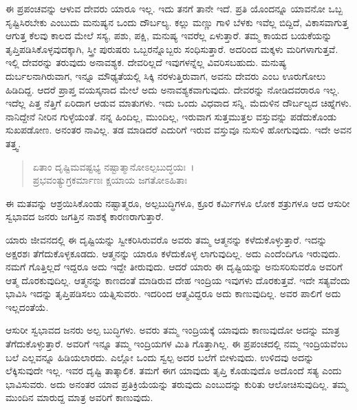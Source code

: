 ಈ ಪ್ರಪಂಚವನ್ನು ಆಳುವ ದೇವರು ಯಾರೂ ಇಲ್ಲ. ಇದು ತನಗೆ ತಾನೇ ಇದೆ. ಪ್ರತಿ ಯೊಂದನ್ನೂ ಯಾವನೋ ಒಬ್ಬ ಸೃಷ್ಟಿಸಿರಬೇಕು ಎಂಬುದು ಮನುಷ್ಯನ ಒಂದು ದೌರ್ಬಲ್ಯ. ಕಲ್ಲು ಮಣ್ಣು ಗಾಳಿ ಬೆಳಕು ಇವೆಲ್ಲ ಬಿದ್ದಿದೆ, ವಿಕಾಸವಾಗುತ್ತ ಆಗುತ್ತ ಕೆಲವು ಕಾಲದ ಮೇಲೆ ಸಸ್ಯ, ಪಶು, ಪಕ್ಷಿ, ಮನುಷ್ಯ ಇವರೆಲ್ಲ ಏಳುತ್ತಾರೆ. ತಮ್ಮ ಕಾಯದ ಬಯಕೆಯನ್ನು ತೃಪ್ತಿಪಡಿಸಿಕೊಳ್ಳವುದಕ್ಕಾಗಿ, ಸ್ತ್ರೀ ಪುರುಷರು ಒಬ್ಬರನ್ನೊಬ್ಬರು ಸಂಧಿಸುತ್ತಾರೆ. ಅದರಿಂದ ಮಕ್ಕಳು ಮರಿಗಳಾಗುತ್ತವೆ. ಇಲ್ಲಿ ದೇವರನ್ನು ತರುವುದು ಅನಾವಶ್ಯಕ. ದೇವರಿಲ್ಲದೆ ಇವುಗಳನ್ನೆಲ್ಲ ವಿವರಿಸಬಹುದು. ಮನುಷ್ಯ ದುರ್ಬಲನಾಗಿರುವಾಗ, ಇನ್ನೂ ಮೌಢ್ಯತೆಯಲ್ಲಿ ಸಿಕ್ಕಿ ನರಳುತ್ತಿರುವಾಗ, ಅವನು ದೇವರು ಎಂಬ ಊರುಗೋಲು ಹಿಡಿದಿದ್ದ. ಆದರೆ ಪ್ರಾಪ್ತ ವಯಸ್ಕನಾದ ಮೇಲೆ ಅದು ಅನಾವಶ್ಯಕವಾಗುವುದು. ದೇವರನ್ನು ನೋಡಿದವರಾರೂ ಇಲ್ಲ. ಇದೆಲ್ಲ ಪಿತ್ತ ನೆತ್ತಿಗೆ ಏರಿದಾಗ ಆಡುವ ಮಾತುಗಳು. ಇದು ಒಂದು ವಿಧವಾದ ಸನ್ನಿ. ಮೆದುಳಿನ ದೌರ್ಬಲ್ಯದ ಚಿಹ್ನೆಗಳು. ನಾನಿದ್ದೇನೆ ನೀರಿನ ಗುಳ್ಳೆಯಂತೆ. ನನ್ನ ಹಿಂದಿಲ್ಲ, ಮುಂದಿಲ್ಲ, ಇರುವಾಗ ಸುತ್ತಮುತ್ತಲ ವಸ್ತುವನ್ನು ಪಡೆದುಕೊಂಡು ಸುಖಪಡೋಣ. ಅನಂತರ ನಾವಿಲ್ಲ. ತಡ ಮಾಡಿದರೆ ಎದುರಿಗೆ ಇರುವ ವಸ್ತುವೂ ನುಸುಳಿ ಹೋಗುವುದು. ಇದೇ ಅವನ ತತ್ತ್ವ.

\begin{verse}
ಏತಾಂ ದೃಷ್ಟಿಮವಷ್ಟಭ್ಯ ನಷ್ಟಾತ್ಮಾನೋಽಲ್ಪಬುದ್ಧಯಃ~।\\ಪ್ರಭವಂತ್ಯುಗ್ರಕರ್ಮಾಣಃ ಕ್ಷಯಾಯ ಜಗತೋಽಹಿತಾಃ 
\end{verse}

{\small ಈ ಮತವನ್ನು ಆಶ್ರಯಿಸಿಕೊಂಡು ನಷ್ಟಾತ್ಮರೂ, ಅಲ್ಪಬುದ್ಧಿಗಳೂ, ಕ್ರೂರ ಕರ್ಮಿಗಳೂ ಲೋಕ ಶತ್ರುಗಳೂ ಆದ ಆಸುರೀ ಸ್ವಭಾವದ ಜನರು ಜಗತ್ತಿನ ನಾಶಕ್ಕೆ ಕಾರಣರಾಗುತ್ತಾರೆ.}

ಯಾರು ಜೀವನದಲ್ಲಿ ಈ ದೃಷ್ಟಿಯನ್ನು ಸ್ವೀಕರಿಸಿರುವರೊ ಅವರು ತಮ್ಮ ಆತ್ಮನನ್ನು ಕಳೆದುಕೊಳ್ಳುತ್ತಾರೆ. ಇದನ್ನು ಅಕ್ಷರಶಃ ತೆಗೆದುಕೊಳ್ಳಕೂಡದು. ಆತ್ಮನನ್ನು ಯಾರೂ ಕಳೆದುಕೊಳ್ಳ ಲಾಗುವುದಿಲ್ಲ. ಅದು ಎಂದೆಂದಿಗೂ ಇರುವುದು. ನಮಗೆ ಗೊತ್ತಿಲ್ಲದೆ ಇದ್ದರೂ ಅದು ಇದ್ದೇ ತೀರುವುದು. ಆದರೆ ಯಾರು ಈ ದೃಷ್ಟಿಯನ್ನು ಅನುಸರಿಸುವರೊ ಅವರಿಗೆ ಆತ್ಮ ದೊರಕುವುದಿಲ್ಲ. ಆತ್ಮನನ್ನು ಕಾಣದಂತೆ ಮಾಡಿರುವ ದೇಹ ಇಂದ್ರಿಯ ಇವುಗಳು ದೊರಕುತ್ತವೆ. ಇದೇ ಸತ್ಯವೆಂದು ಭಾವಿಸಿ ಇದನ್ನು ತೃಪ್ತಿಪಡಿಸಲು ಯತ್ನಿಸುವರು. ಇದರಿಂದ ಆತ್ಮವಿದ್ದರೂ ಅದು ಕಾಣುವುದಿಲ್ಲ. ಅವರ ಪಾಲಿಗೆ ಅದು ಇಲ್ಲದಂತೆಯೆ.

ಆಸುರೀ ಸ್ವಭಾವದ ಜನರು ಅಲ್ಪ ಬುದ್ಧಿಗಳು. ಅವರು ತಮ್ಮ ಇಂದ್ರಿಯಕ್ಕೆ ಯಾವುದು ಕಾಣುವುದೋ ಅದನ್ನು ಮಾತ್ರ ತೆಗೆದುಕೊಳ್ಳುತ್ತಾರೆ. ಅವರಿಗೆ ಇನ್ನೂ ತಮ್ಮ ಇಂದ್ರಿಯಗಳ ಮಿತಿ ಗೊತ್ತಾಗಿಲ್ಲ. ಈ ಪ್ರಪಂಚದಲ್ಲಿ ನಮ್ಮ ಇಂದ್ರಿಯವೆಂಬ ಬಲೆ ಎಲ್ಲವನ್ನೂ ಹಿಡಿಯಲಾರದು. ಎಲ್ಲೋ ಒಂದು ಸ್ವಲ್ಪ ಅದರ ಬಲೆಗೆ ಬೀಳುವುದು. ಉಳಿದವು ಅದನ್ನು ಲೆಕ್ಕಿಸುವುದೇ ಇಲ್ಲ. ಇವರ ದೃಷ್ಟಿ ತಾತ್ಕಾಲಿಕ. ತಮಗೆ ಈಗ ಯಾವುದು ತೃಪ್ತಿ ಕೊಡುವುದೊ ಅದೊಂದೆ ಸತ್ಯ ಎಂದು ಭಾವಿಸುವರು. ಅದು ಅನಂತರ ಯಾವ ಪ್ರತಿಕ್ರಿಯೆಯನ್ನು ತರುವುದು ಎಂಬುದನ್ನು ಕುರಿತು ಆಲೋಚಿಸುವುದಿಲ್ಲ. ತಮ್ಮ ಮುಂದಿನ ಮಾರುದ್ದ ಮಾತ್ರ ಅವರಿಗೆ ಕಾಣುವುದು.

